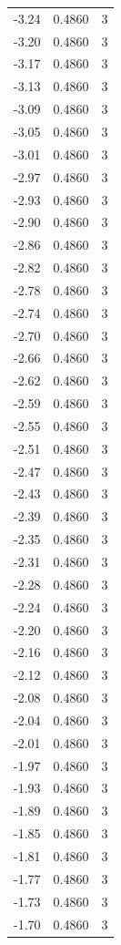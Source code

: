 \begin{longtable}{lrr}
  -3.24 & 0.4860 & 3 \\
  -3.20 & 0.4860 & 3 \\
  -3.17 & 0.4860 & 3 \\
  -3.13 & 0.4860 & 3 \\
  -3.09 & 0.4860 & 3 \\
  -3.05 & 0.4860 & 3 \\
  -3.01 & 0.4860 & 3 \\
  -2.97 & 0.4860 & 3 \\
  -2.93 & 0.4860 & 3 \\
  -2.90 & 0.4860 & 3 \\
  -2.86 & 0.4860 & 3 \\
  -2.82 & 0.4860 & 3 \\
  -2.78 & 0.4860 & 3 \\
  -2.74 & 0.4860 & 3 \\
  -2.70 & 0.4860 & 3 \\
  -2.66 & 0.4860 & 3 \\
  -2.62 & 0.4860 & 3 \\
  -2.59 & 0.4860 & 3 \\
  -2.55 & 0.4860 & 3 \\
  -2.51 & 0.4860 & 3 \\
  -2.47 & 0.4860 & 3 \\
  -2.43 & 0.4860 & 3 \\
  -2.39 & 0.4860 & 3 \\
  -2.35 & 0.4860 & 3 \\
  -2.31 & 0.4860 & 3 \\
  -2.28 & 0.4860 & 3 \\
  -2.24 & 0.4860 & 3 \\
  -2.20 & 0.4860 & 3 \\
  -2.16 & 0.4860 & 3 \\
  -2.12 & 0.4860 & 3 \\
  -2.08 & 0.4860 & 3 \\
  -2.04 & 0.4860 & 3 \\
  -2.01 & 0.4860 & 3 \\
  -1.97 & 0.4860 & 3 \\
  -1.93 & 0.4860 & 3 \\
  -1.89 & 0.4860 & 3 \\
  -1.85 & 0.4860 & 3 \\
  -1.81 & 0.4860 & 3 \\
  -1.77 & 0.4860 & 3 \\
  -1.73 & 0.4860 & 3 \\
  -1.70 & 0.4860 & 3 \\

\end{longtable}
